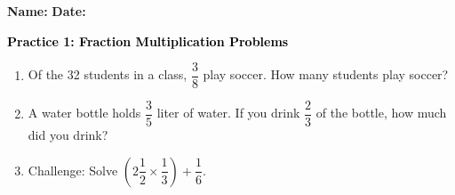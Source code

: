 \documentclass[12pt, letterpaper, fleqn]{article}
\begin{document}
\textbf{Name:} \underline{\hspace{5cm}}
\hfill
\textbf{Date:} \underline{\hspace{3cm}}\\

\begin{tcolorbox}[colback=customteal!20]
    \large\textcolor{black}{\textbf{Practice 1: Fraction Multiplication Problems}}
\end{tcolorbox}
\begin{enumerate}[itemsep=3.5cm, leftmargin=0.6cm]
\item Of the 32 students in a class, $\dfrac{3}{8}$ play soccer. How many students play soccer?
\vspace{3.5cm}
\item A water bottle holds $\dfrac{3}{5}$ liter of water. If you drink $\dfrac{2}{3}$ of the bottle, how much did you drink?
\vspace{3.5cm}
\item Challenge: Solve $\left(2\dfrac{1}{2} \times \dfrac{1}{3}\right) + \dfrac{1}{6}$.
\end{enumerate}
\end{document}
